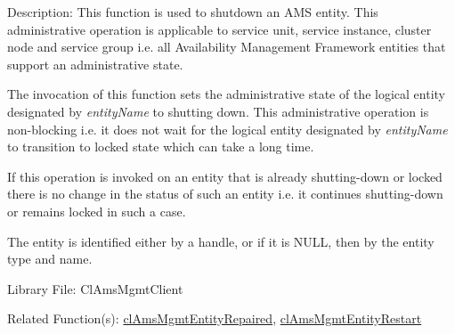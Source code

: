 \begin{Desc}
\item[Description:]This function is used to shutdown an AMS entity. This administrative operation is applicable to service unit, service instance, cluster node and service group i.e. all Availability Management Framework entities that support an administrative state. \par
 \par
 The invocation of this function sets the administrative state of the logical entity designated by {\em entity\-Name\/} to shutting down. This administrative operation is non-blocking i.e. it does not wait for the logical entity designated by {\em entity\-Name\/} to transition to locked state which can take a long time. \par
 \par
 If this operation is invoked on an entity that is already shutting-down or locked there is no change in the status of such an entity i.e. it continues shutting-down or remains locked in such a case. \par
 \par
 The entity is identified either by a handle, or if it is NULL, then by the entity type and name.\end{Desc}
\begin{Desc}
\item[Library File:]Cl\-Ams\-Mgmt\-Client\end{Desc}
\begin{Desc}
\item[Related Function(s):]\hyperlink{pageams115}{cl\-Ams\-Mgmt\-Entity\-Repaired}, \hyperlink{pageams114}{cl\-Ams\-Mgmt\-Entity\-Restart} \end{Desc}

\newpage
